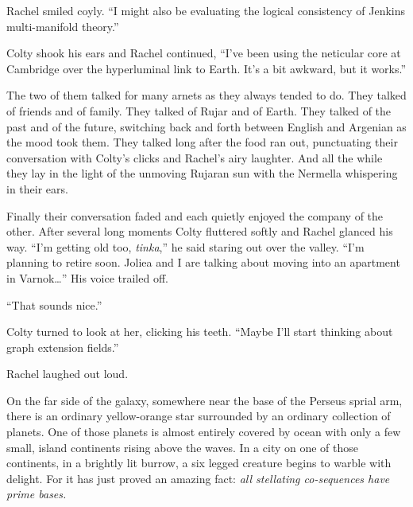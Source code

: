 Rachel smiled coyly. ``I might also be evaluating the logical consistency of Jenkins
multi-manifold theory.''

Colty shook his ears and Rachel continued, ``I've been using the neticular core at Cambridge
over the hyperluminal link to Earth. It's a bit awkward, but it works.''

The two of them talked for many arnets as they always tended to do. They talked of friends and
of family. They talked of Rujar and of Earth. They talked of the past and of the future,
switching back and forth between English and Argenian as the mood took them. They talked long
after the food ran out, punctuating their conversation with Colty's clicks and Rachel's airy
laughter. And all the while they lay in the light of the unmoving Rujaran sun with the Nermella
whispering in their ears.

Finally their conversation faded and each quietly enjoyed the company of the other. After
several long moments Colty fluttered softly and Rachel glanced his way. ``I'm getting old too,
\textit{tinka},'' he said staring out over the valley. ``I'm planning to retire soon. Joliea and
I are talking about moving into an apartment in Varnok\ldots'' His voice trailed off.

``That sounds nice.''

Colty turned to look at her, clicking his teeth. ``Maybe I'll start thinking about graph
extension fields.''

Rachel laughed out loud.

\spacebreak

On the far side of the galaxy, somewhere near the base of the Perseus sprial arm, there is an
ordinary yellow-orange star surrounded by an ordinary collection of planets. One of those
planets is almost entirely covered by ocean with only a few small, island continents rising
above the waves. In a city on one of those continents, in a brightly lit burrow, a six legged
creature begins to warble with delight. For it has just proved an amazing fact: \textit{all
  stellating co-sequences have prime bases.}
